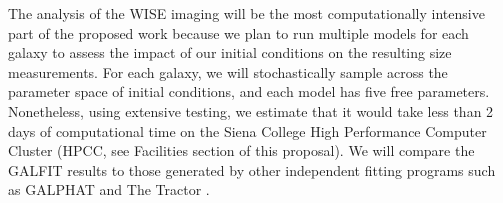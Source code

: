 \documentclass[11pt, preprint]{aastex}
\begin{document}
{%


The analysis of the WISE imaging will be the most computationally
intensive part of the proposed work because we plan to run multiple
models for each galaxy to assess the impact of our initial conditions
on the resulting size measurements.  For each galaxy, we will
stochastically sample across the parameter space of initial
conditions, and each model has five free parameters.  Nonetheless,
using extensive testing, we estimate that it would take less than 2
days of computational time on the Siena College High Performance
Computer Cluster (HPCC, see Facilities section of this proposal).  We will compare the GALFIT results to those
generated by other independent fitting programs such as  GALPHAT \citep{yoon11} and The Tractor \citep{lang16}.

}
\end{document}
